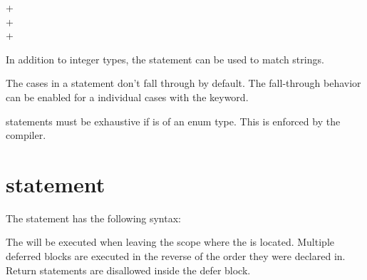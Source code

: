 \begin{grammar}
 \textrightarrow{}  \code{(}  \code{)} \code{\{} + \code{\}}\\
 \textrightarrow{}   \code{:} +\\
 \textrightarrow{}  \code{:} +
\end{grammar}

In addition to integer types, the  statement can be used to match
strings.

The cases in a  statement don't fall through by default. The
fall-through behavior can be enabled for a individual cases with the
 keyword.

 statements must be exhaustive if  is of an
enum type. This is enforced by the compiler.

\section{ statement}

The  statement has the following syntax:

\begin{grammar}
 \textrightarrow{}  
\end{grammar}

The  will be executed when leaving the scope where the
 is located. Multiple deferred blocks are executed
in the reverse of the order they were declared in. Return statements are
disallowed inside the defer block.
